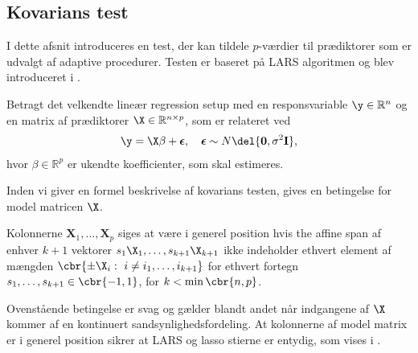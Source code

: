 \subsection{Kovarians test} \label{subsec:kovarians_test}
I dette afsnit introduceres en test, der kan tildele \(p\)-værdier til prædiktorer som er udvalgt af adaptive procedurer.
Testen er baseret på LARS algoritmen og blev introduceret i \citep{lockhart}.

Betragt det velkendte lineær regression setup med en responsvariable \(\y \in \mathbb{R}^n\) og en matrix af prædiktorer \(\X \in \mathbb{R}^{n \times p}\), som er relateret ved
\begin{align}
\y = \X \beta + \boldsymbol{\epsilon}, \quad \boldsymbol{\epsilon} \sim N\del{\mathbf{0}, \sigma^2 \mathbf{I}}, \label{eq:set-up}
\end{align}
hvor \(\beta \in \mathbb{R}^p\) er ukendte koefficienter, som skal estimeres.

%

Inden vi giver en formel beskrivelse af kovarians testen, gives en betingelse for model matricen \(\X\).
\begin{defn}
Kolonnerne \(\mathbf{X}_1, \ldots, \mathbf{X}_p\) siges at være i generel position hvis the affine span af enhver \(k+1\) vektorer \(s_1 \X_1, \ldots, s_{k+1} \X_{k+1}\) ikke indeholder ethvert element af mængden \(\cbr{\pm \X_i : \ i \neq i_1, \ldots, i_{k+1}}\) for ethvert fortegn \(s_1, \ldots, s_{k+1} \in \cbr{-1,1}\), for \(k < \min \cbr{n,p}\). 
\end{defn}
Ovenstående betingelse er svag og gælder blandt andet når indgangene af \(\X\) kommer af en kontinuert sandsynlighedsfordeling.
At kolonnerne af model matrix er i generel position sikrer at LARS og lasso stierne er entydig, som vises i \citep{lasso_unique}.

